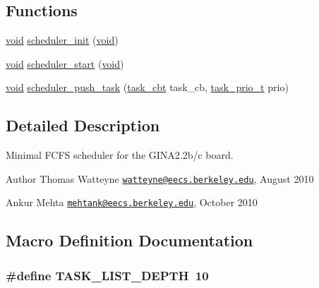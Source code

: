\subsection*{Functions}
\begin{DoxyCompactItemize}
\item 
\hyperlink{usb__devapi_8h_afabf60e7f57651d6d595a02c75f07cd0}{void} \hyperlink{group___scheduler_gab258cc2856e5f6bb125907cc23358fbd}{scheduler\+\_\+init} (\hyperlink{usb__devapi_8h_afabf60e7f57651d6d595a02c75f07cd0}{void})
\item 
\hyperlink{usb__devapi_8h_afabf60e7f57651d6d595a02c75f07cd0}{void} \hyperlink{group___scheduler_ga6229a629147366d0af22ca2228612dc8}{scheduler\+\_\+start} (\hyperlink{usb__devapi_8h_afabf60e7f57651d6d595a02c75f07cd0}{void})
\item 
\hyperlink{usb__devapi_8h_afabf60e7f57651d6d595a02c75f07cd0}{void} \hyperlink{group___scheduler_ga5613eda7e7cabb9412e590b8eb7fa778}{scheduler\+\_\+push\+\_\+task} (\hyperlink{group___scheduler_gad18d3f32b9193516d5f1849adc9d434e}{task\+\_\+cbt} task\+\_\+cb, \hyperlink{group___scheduler_gaf646a0e571d9fb8ee8c4f7291d407965}{task\+\_\+prio\+\_\+t} prio)
\end{DoxyCompactItemize}


\subsection{Detailed Description}
Minimal F\+C\+FS scheduler for the G\+I\+N\+A2.\+2b/c board. 

\begin{DoxyAuthor}{Author}
Thomas Watteyne \href{mailto:watteyne@eecs.berkeley.edu}{\tt watteyne@eecs.\+berkeley.\+edu}, August 2010 

Ankur Mehta \href{mailto:mehtank@eecs.berkeley.edu}{\tt mehtank@eecs.\+berkeley.\+edu}, October 2010 
\end{DoxyAuthor}


\subsection{Macro Definition Documentation}
\subsubsection[{\texorpdfstring{T\+A\+S\+K\+\_\+\+L\+I\+S\+T\+\_\+\+D\+E\+P\+TH}{TASK_LIST_DEPTH}}]{\setlength{\rightskip}{0pt plus 5cm}\#define T\+A\+S\+K\+\_\+\+L\+I\+S\+T\+\_\+\+D\+E\+P\+TH~10}\hypertarget{group___scheduler_gaab36173783d65a27ad398a411d01bf98}{}\label{group___scheduler_gaab36173783d65a27ad398a411d01bf98}


